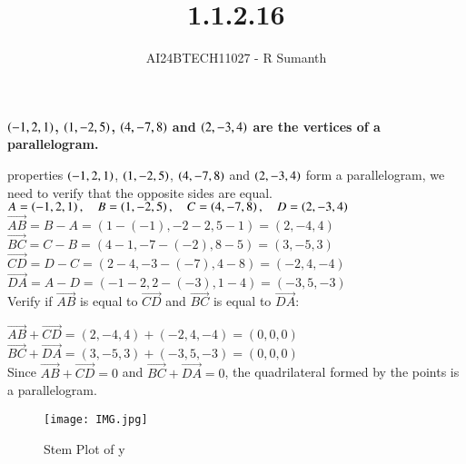 \documentclass[journal]{IEEEtran}
\begin{document}

\vspace{3cm}

\title{1.1.2.16}
\author{AI24BTECH11027 - R Sumanth}
{\let\newpage\relax\maketitle}

\renewcommand{\thefigure}{\theenumi}
\renewcommand{\thetable}{\theenumi}
\setlength{\intextsep}{10pt} %



\textbf{ $\left(-1,2,1\right)$, $\left(1,-2,5\right)$, $\left(4,-7,8\right)$ and $\left(2,-3,4\right)$ are the vertices of a parallelogram.} 

\solution

properties $\left(-1, 2, 1\right)$, $\left(1, -2, 5\right)$, $\left(4, -7, 8\right)$ and $\left(2, -3, 4\right)$ form a parallelogram, we need to verify that the opposite sides are equal.\\

$A = \left(-1, 2, 1\right), \quad B = \left(1, -2, 5\right), \quad C = \left(4, -7, 8\right), \quad D = \left(2, -3, 4\right)$ \\


$\overrightarrow{AB} = B - A = (1 - (-1), -2 - 2, 5 - 1) = (2, -4, 4)$ \\

$\overrightarrow{BC} = C - B = (4 - 1, -7 - (-2), 8 - 5) = (3, -5, 3)$ \\

$\overrightarrow{CD} = D - C = (2 - 4, -3 - (-7), 4 - 8) = (-2, 4, -4)$ \\

$\overrightarrow{DA} = A - D = (-1 - 2, 2 - (-3), 1 - 4) = (-3, 5, -3)$ \\

Verify if $\overrightarrow{AB}$ is equal to $ \overrightarrow{CD} $ and $ \overrightarrow{BC} $ is equal to $ \overrightarrow{DA} $:

$\overrightarrow{AB} + \overrightarrow{CD} = (2, -4, 4) + (-2, 4, -4) = (0, 0, 0)$ \\

$\overrightarrow{BC} + \overrightarrow{DA} = (3, -5, 3) + (-3, 5, -3) = (0, 0, 0)$ \\

Since $\overrightarrow{AB} + \overrightarrow{CD} = 0 $ and $ \overrightarrow{BC} + \overrightarrow{DA} = 0 $, the quadrilateral formed by the points is a parallelogram.

\begin{figure}[h!]
   \centering
   \texttt{[image: IMG.jpg]}
   \caption{Stem Plot of y}
     \label{stemplot}
\end{figure}

\renewcommand{\thetable}{\theenumi}
\end{document}
